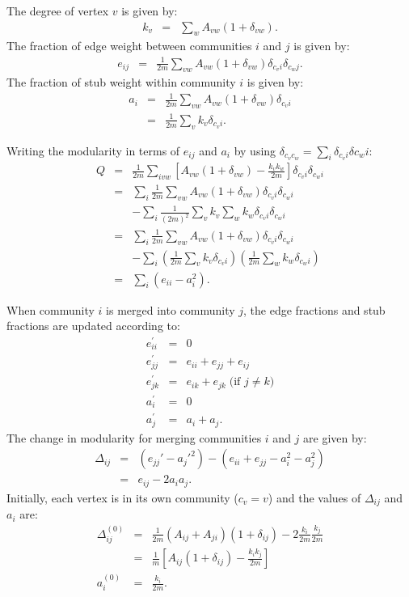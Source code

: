 \documentclass{article}
\newcommand{\beq}{\begin{eqnarray}}
\newcommand{\eeq}{\end{eqnarray}}
\begin{document}
The degree of vertex $v$ is given by:
\beq
k_v &=& \sum_w A_{vw} (1+\delta_{vw}).
\eeq
The fraction of edge weight between communities $i$ and $j$ is given by:
\beq
e_{ij} &=& \frac{1}{2m}\sum_{vw} A_{vw} (1+\delta_{vw}) \delta_{c_vi}\delta_{c_wj}.
\eeq
The fraction of stub weight within community $i$ is given by:
\beq
a_i &=& \frac{1}{2m}\sum_{vw}A_{vw} (1 + \delta_{vw}) \delta_{c_vi} \\
&=& \frac{1}{2m}\sum_v k_v \delta_{c_vi}.
\eeq

Writing the modularity in terms of $e_{ij}$ and $a_i$ by using
$\delta_{c_vc_w} = \sum_i \delta_{c_vi}\delta{c_wi}$:
\beq
Q &=& \frac{1}{2m} \sum_{ivw} \left[ A_{vw} (1 + \delta_{vw}) - \frac{k_v k_w}{2m} \right]\delta_{c_v i}\delta_{c_w i} \\
&=& \sum_i 
\frac{1}{2m} \sum_{vw} A_{vw} (1 + \delta_{vw}) \delta_{c_v i}\delta_{c_w i}  \nonumber \\
&& - \sum_i  \frac{1}{(2m)^2} \sum_{v} k_v \sum_w k_w \delta_{c_v i}\delta_{c_w i}  \\
&=& \sum_i 
\frac{1}{2m} \sum_{vw} A_{vw} (1 + \delta_{vw}) \delta_{c_v i}\delta_{c_w i}  \nonumber \\
&& - \sum_i  \left( \frac{1}{2m} \sum_{v} k_v \delta_{c_v i} \right) \left(\frac{1}{2m}\sum_w k_w \delta_{c_w i} \right) \\
&=& \sum_i \left( e_{ii} - a_i^2 \right).
\eeq

When community $i$ is merged into community $j$, the edge fractions and stub
fractions are updated according to:
\beq
e_{ii}^\prime &=& 0 \\
e_{jj}^\prime &=& e_{ii} + e_{jj} + e_{ij} \\
e_{jk}^\prime &=& e_{ik} + e_{jk} \; \text{(if $j \neq k$)}\\
a_i^\prime &=& 0 \\
a_j^\prime &=& a_i + a_j.
\eeq
The change in modularity for merging communities $i$ and $j$ are given by:
\beq
\Delta_{ij} &=& \left( e_{jj}' - a_j'^2 \right)
- \left(e_{ii} + e_{jj} - a_i^2 - a_j^2 \right) \\
&=&
e_{ij} - 2 a_i a_j.
\eeq
Initially, each vertex is in its own community ($c_v = v$)
and the values of $\Delta_{ij}$ and $a_i$ are:
\beq
\Delta^{(0)}_{ij} &=&
\frac{1}{2m}(A_{ij} + A_{ji})(1 + \delta_{ij})
- 2\frac{k_i}{2m}\frac{k_j}{2m} \\
 &=& \frac{1}{m}\left[ A_{ij}(1+\delta_{ij}) - \frac{k_ik_j}{2m}\right] \\
 a_i^{(0)} &=& \frac{k_i}{2m}.
\eeq
\end{document}
